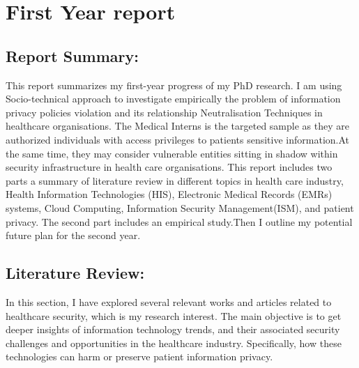 

\chapter{First Year report}

\section{Report Summary:}
This report summarizes my first-year progress of my PhD research. I am using Socio-technical approach to  investigate empirically the problem of information privacy policies violation and its relationship Neutralisation Techniques in healthcare organisations. The Medical Interns is the targeted sample as they are authorized individuals with access privileges to patients sensitive information.At the same time, they may consider vulnerable entities sitting in shadow within security infrastructure in health care organisations. This report includes two parts a summary of literature review in different topics in health care industry, Health Information Technologies (HIS), Electronic Medical Records (EMRs) systems, Cloud Computing, Information Security Management(ISM), and patient privacy. The second part includes an empirical study.Then I outline my potential future plan for the second year.



\section{Literature Review:}
In this section, I have explored several relevant works and articles related to healthcare security, which is my research interest. The main objective is to get deeper insights of information technology trends, and their associated security challenges and opportunities in the healthcare industry. Specifically, how these technologies can harm or preserve patient information privacy.
